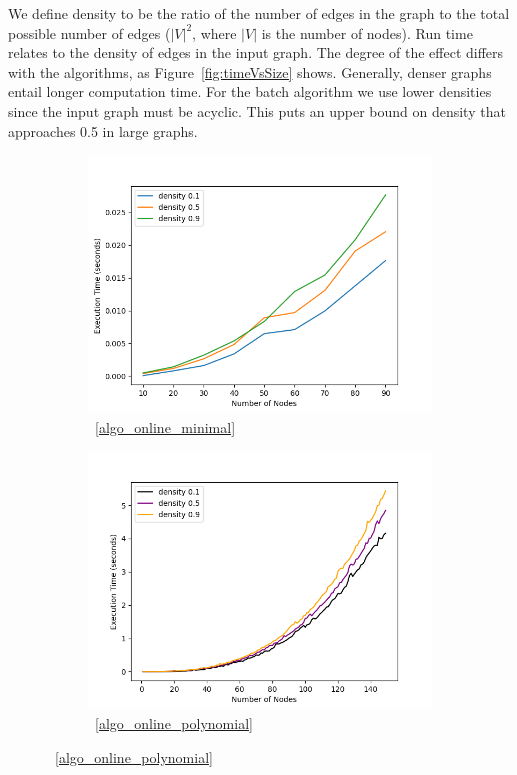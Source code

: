 \documentclass[sigplan,review,anonymous]{acmart}
\begin{document}
{We define density to be the ratio of the number of edges in the graph to the total possible number of edges ($|V|^2$, where $|V|$ is the number of nodes).
Run time relates to the density of edges in the input graph.
The degree of the effect differs with the algorithms, as Figure~\ref{fig:timeVsSize} shows.
Generally, denser graphs entail longer computation time.
For the batch algorithm we use lower densities since the input graph must be acyclic. This puts an upper bound on density that approaches 0.5 in large graphs.

\begin{figure}
    \begin{subfigure}{\linewidth}
      \includegraphics[width=\linewidth]{timeVsSize_10_OptimalSet.png}
      \caption{~\ref{algo_online_minimal}}
      \label{fig:sfigOptimalTvsS}
    \end{subfigure}

    \begin{subfigure}{\linewidth}
      \includegraphics[width=\linewidth]{timeVsSize_10_Polynomial.png}
      \caption{~\ref{algo_online_polynomial}}
      \label{fig:sfigPolynomialTvsS}
    \end{subfigure}
    

\end{figure}}
\end{document}
